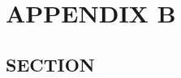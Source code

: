 \documentclass[../main/main]{subfiles}
\begin{document}
\chapter{APPENDIX B}

\section{SECTION}
\end{document}
